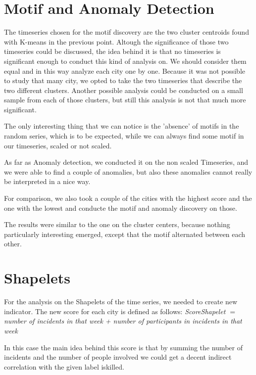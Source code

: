\section{Motif and Anomaly Detection}

The timeseries chosen for the motif discovery are the two cluster centroids found with K-means in the previous point.
Altough the significance of those two timeseries could be discussed, the idea behind it is that no timeseries is significant enough to conduct this kind of analysis on.
We should consider them equal and in this way analyze each city one by one.
Because it was not possible to study that many city, we opted to take the two timeseries that describe the two different clusters.
Another possible analysis could be conducted on a small sample from each of those clusters, but still this analysis is not that much more significant.

The only interesting thing that we can notice is the 'absence' of motifs in the random series, which is to be expected, while we can always find some motif in our timeseries, scaled or not scaled.

As far as Anomaly detection, we conducted it on the non scaled Timeseries, and we were able to find a couple of anomalies, but also these anomalies cannot really be interpreted in a nice way.

For comparison, we also took a couple of the cities with the highest score and the one with the lowest and conducte the motif and anomaly discovery on those.

The results were similar to the one on the cluster centers, because nothing particularly interesting emerged, except that the motif alternated between each other.



\section{Shapelets}

For the analysis on the Shapelets of the time series, we needed to create  new indicator.
The new score for each city is defined as follows:
\textit{Score\textunderscore Shapelet $=$ number of incidents in that week + number of participants in incidents in that week}

In this case the main idea behind this score is that by summing the number of incidents and the number of people involved we could get a decent indirect correlation with the given label is\textunderscore killed.

